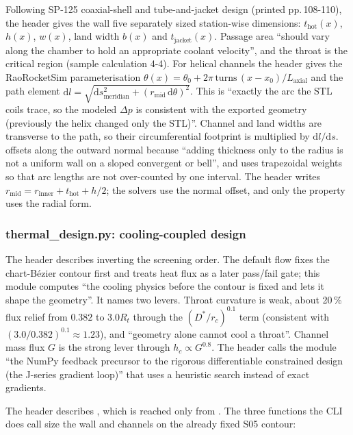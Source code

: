 Following SP-125 coaxial-shell and tube-and-jacket design (printed pp.\,108-110), the header gives the wall five separately sized station-wise dimensions: $t_{\mathrm{hot}}(x)$, $h(x)$, $w(x)$, land width $b(x)$ and $t_{\mathrm{jacket}}(x)$. Passage area ``should vary along the chamber to hold an appropriate coolant velocity'', and the throat is the critical region (sample calculation 4-4). For helical channels the header gives the RaoRocketSim parameterisation $\theta(x) = \theta_0 + 2\pi\,\mathrm{turns}\,(x-x_0)/L_{\mathrm{axial}}$ and the path element $\mathrm{d}l = \sqrt{\mathrm{d}s_{\mathrm{meridian}}^2 + (r_{\mathrm{mid}}\,\mathrm{d}\theta)^2}$. This is ``exactly the arc the STL coils trace, so the modeled $\Delta p$ is consistent with the exported geometry (previously the helix changed only the STL)''. Channel and land widths are transverse to the path, so their circumferential footprint is multiplied by $\mathrm{d}l/\mathrm{d}s$.  offsets along the outward normal because ``adding thickness only to the radius is not a uniform wall on a sloped convergent or bell'', and  uses trapezoidal weights so that arc lengths are not over-counted by one interval. The header writes $r_{\mathrm{mid}} = r_{\mathrm{inner}} + t_{\mathrm{hot}} + h/2$; the solvers use the normal offset, and only the  property uses the radial form.

\subsubsection*{thermal\_design.py: cooling-coupled design}

The header describes inverting the screening order. The default flow fixes the chart-B\'ezier contour first and treats heat flux as a later pass/fail gate; this module computes ``the cooling physics before the contour is fixed and lets it shape the geometry''. It names two levers. Throat curvature  is weak, about 20\,\% flux relief from $0.382$ to $3.0R_t$ through the $(D^*/r_c)^{0.1}$ term (consistent with $(3.0/0.382)^{0.1} \approx 1.23$), and ``geometry alone cannot cool a throat''. Channel mass flux $G$ is the strong lever through $h_c \propto G^{0.8}$. The header calls the module ``the NumPy feedback precursor to the rigorous differentiable constrained design (the J-series gradient loop)'' that uses a heuristic search instead of exact gradients.

The header describes , which is reached only from . The three functions the CLI does call size the wall and channels on the already fixed S05 contour:

